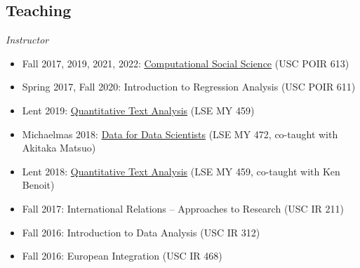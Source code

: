 \documentclass[margin,line,11pt]{resume}
\begin{document}
\begin{resume}
            \section{\mysidestyle Teaching}

\emph{Instructor}
\begin{itemize}
\item Fall 2017, 2019, 2021, 2022: \href{http://pablobarbera.com/POIR613/}{Computational Social Science} (USC POIR 613)
\item Spring 2017, Fall 2020: Introduction to Regression Analysis (USC POIR 611)
\item Lent 2019: \href{https://lse-my459.github.io/}{Quantitative Text Analysis} (LSE MY 459)
\item Michaelmas 2018: \href{https://lse-my472.github.io/}{Data for Data Scientists} (LSE MY 472, co-taught with Akitaka Matsuo)
\item Lent 2018: \href{https://lse-my459.github.io/}{Quantitative Text Analysis} (LSE MY 459, co-taught with Ken Benoit)
\item Fall 2017: International Relations -- Approaches to Research (USC IR 211)
\item Fall 2016: Introduction to Data Analysis (USC IR 312)
\item Fall 2016: European Integration (USC IR 468)
\end{itemize}




\end{resume}
\end{document}
